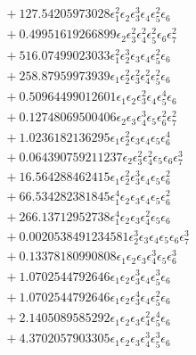 \documentclass[10pt]{article}
\begin{document}
\begin{align*}
&{}  + 127.54205973028 \epsilon_{1}^{2} \epsilon_{2} \epsilon_{3}^{3} \epsilon_{4} \epsilon_{5}^{2} \epsilon_{6} \\
&{}  + 0.49951619266899 \epsilon_{2} \epsilon_{3}^{2} \epsilon_{4}^{2} \epsilon_{5}^{2} \epsilon_{6} \epsilon_{7}^{2} \\
&{}  + 516.07499023033 \epsilon_{1}^{2} \epsilon_{2}^{3} \epsilon_{3} \epsilon_{4} \epsilon_{5}^{2} \epsilon_{6} \\
&{}  + 258.87959973939 \epsilon_{1} \epsilon_{2}^{2} \epsilon_{3}^{2} \epsilon_{4}^{2} \epsilon_{5}^{2} \epsilon_{6} \\
&{}  + 0.50964499012601 \epsilon_{1} \epsilon_{2} \epsilon_{3}^{2} \epsilon_{4} \epsilon_{5}^{4} \epsilon_{6} \\
&{}  + 0.12748069500406 \epsilon_{2} \epsilon_{3} \epsilon_{4}^{3} \epsilon_{5} \epsilon_{6}^{2} \epsilon_{7}^{2} \\
&{}  + 1.0236182136295 \epsilon_{1} \epsilon_{2}^{2} \epsilon_{3} \epsilon_{4} \epsilon_{5} \epsilon_{6}^{4} \\
&{}  + 0.064390759211237 \epsilon_{2} \epsilon_{3}^{2} \epsilon_{4}^{2} \epsilon_{5} \epsilon_{6} \epsilon_{7}^{3} \\
&{}  + 16.564288462415 \epsilon_{1} \epsilon_{2}^{2} \epsilon_{3}^{3} \epsilon_{4} \epsilon_{5} \epsilon_{6}^{2} \\
&{}  + 66.534282381845 \epsilon_{1}^{4} \epsilon_{2} \epsilon_{3} \epsilon_{4} \epsilon_{5} \epsilon_{6}^{2} \\
&{}  + 266.13712952738 \epsilon_{1}^{4} \epsilon_{2} \epsilon_{3} \epsilon_{4}^{2} \epsilon_{5} \epsilon_{6} \\
&{}  + 0.0020538491234581 \epsilon_{2}^{3} \epsilon_{3} \epsilon_{4} \epsilon_{5} \epsilon_{6} \epsilon_{7}^{3} \\
&{}  + 0.13378180990808 \epsilon_{1} \epsilon_{2} \epsilon_{3} \epsilon_{4}^{3} \epsilon_{5} \epsilon_{6}^{3} \\
&{}  + 1.0702544792646 \epsilon_{1} \epsilon_{2} \epsilon_{3}^{3} \epsilon_{4} \epsilon_{5}^{3} \epsilon_{6} \\
&{}  + 1.0702544792646 \epsilon_{1} \epsilon_{2} \epsilon_{3}^{4} \epsilon_{4} \epsilon_{5}^{2} \epsilon_{6} \\
&{}  + 2.1405089585292 \epsilon_{1} \epsilon_{2} \epsilon_{3} \epsilon_{4}^{2} \epsilon_{5}^{4} \epsilon_{6} \\
&{}  + 4.3702057903305 \epsilon_{1} \epsilon_{2} \epsilon_{3} \epsilon_{4}^{3} \epsilon_{5}^{3} \epsilon_{6} \\

\end{align*}
\end{document}

